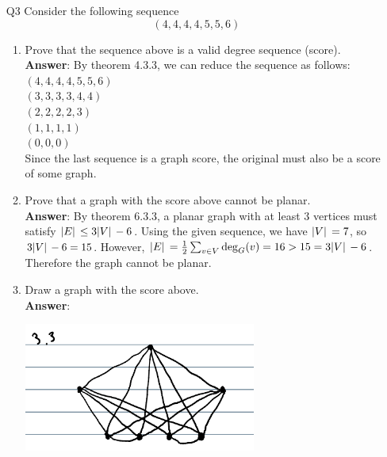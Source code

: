 \documentclass{article}
\begin{document}
\newpage
\begin{itemize}
    \item [Q3] Consider the following sequence \[(4,4,4,4,5,5,6)\]
          \begin{enumerate}
              \item Prove that the sequence above is a valid degree sequence (score).\\
                    \textbf{Answer}: By theorem 4.3.3, we can reduce the sequence as follows:\\
                    $(4,4,4,4,5,5,6)$\\
                    $(3,3,3,3,4,4)$\\
                    $(2,2,2,2,3)$\\
                    $(1,1,1,1)$\\
                    $(0,0,0)$\\
                    Since the last sequence is a graph score, the original must also be a score of some graph.
              \item Prove that a graph with the score above cannot be planar.\\
                    \textbf{Answer}: By theorem 6.3.3, a planar graph with at least 3 vertices must satisfy $\abs*{E}\leq 3\abs*{V}-6$. Using the given sequence, we have $\abs*{V}=7$, so $3\abs*{V}-6=15$. However, $\abs*{E}=\frac{1}{2}\sum_{v\in V}\deg_G(v)=16>15=3\abs*{V}-6$. Therefore the graph cannot be planar.
              \item Draw a graph with the score above.\\
                    \textbf{Answer}:
                    \begin{center}
                        \includegraphics[width=3in]{3-3.png}
                    \end{center}
          \end{enumerate}
\end{itemize}
\end{document}
